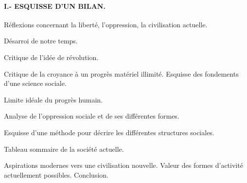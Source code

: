 \documentclass[french,twoside]{book} %
\begin{document}
\paragraph[{I.- ESQUISSE D'UN BILAN.}]{I.- ESQUISSE D'UN BILAN.}

\begin{center}
\noindent \centerline{Réflexions concernant la liberté, l'oppression, la civilisation actuelle.}\par
\end{center}

\noindent Désarroi de notre temps.\par
Critique de l'idée de révolution.\par
Critique de la croyance à un progrès matériel illimité. Esquisse des fondements d'une science sociale.\par
Limite idéale du progrès humain.\par
Analyse de l'oppression sociale et de ses différentes formes.\par
Esquisse d'une méthode pour décrire les différentes structures sociales.\par
Tableau sommaire de la société actuelle.\par
Aspirations modernes vers une civilisation nouvelle. Valeur des formes d'activité actuellement possibles. Conclusion.
\end{document}
